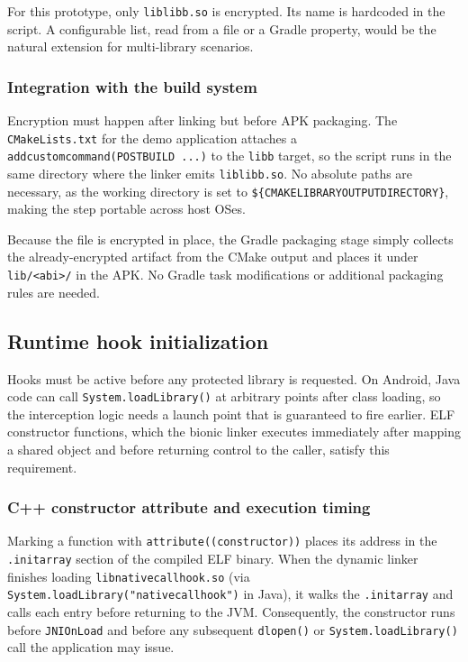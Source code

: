 \documentclass[11pt,a4paper]{report}
\renewcommand\_{{\textunderscore\allowbreak}}
\begin{document}
For this prototype, only \texttt{liblibb.so} is encrypted. Its name is hardcoded in the script. A configurable list, read from a file or a Gradle property, would be the natural extension for multi-library scenarios.

\subsubsection{Integration with the build system}

Encryption must happen after linking but before APK packaging. The \texttt{CMakeLists.txt} for the demo application attaches a \texttt{add\_custom\_command(POST\_BUILD ...)} to the \texttt{libb} target, so the script runs in the same directory where the linker emits \texttt{liblibb.so}. No absolute paths are necessary, as the working directory is set to \texttt{\$\{CMAKE\_LIBRARY\_OUTPUT\_DIRECTORY\}}, making the step portable across host OSes.

Because the file is encrypted in place, the Gradle packaging stage simply collects the already-encrypted artifact from the CMake output and places it under \texttt{lib/<abi>/} in the APK. No Gradle task modifications or additional packaging rules are needed.

\subsection{Runtime hook initialization}

Hooks must be active before any protected library is requested. On Android, Java code can call \linebreak \texttt{System.loadLibrary()} at arbitrary points after class loading, so the interception logic needs a launch point that is guaranteed to fire earlier. ELF constructor functions, which the bionic linker executes immediately after mapping a shared object and before returning control to the caller, satisfy this requirement.

\subsubsection{C++ constructor attribute and execution timing}

Marking a function with \texttt{\_\_attribute\_\_((constructor))} places its address in the \texttt{.init\_array} section of the compiled ELF binary. When the dynamic linker finishes loading \texttt{libnativecallhook.so} (via \texttt{System.loadLibrary("nativecallhook")} in Java), it walks the \texttt{.init\_array} and calls each entry before returning to the JVM. Consequently, the constructor runs before \texttt{JNI\_OnLoad} and before any subsequent \texttt{dlopen()} or \texttt{System.loadLibrary()} call the application may issue.
\end{document}
